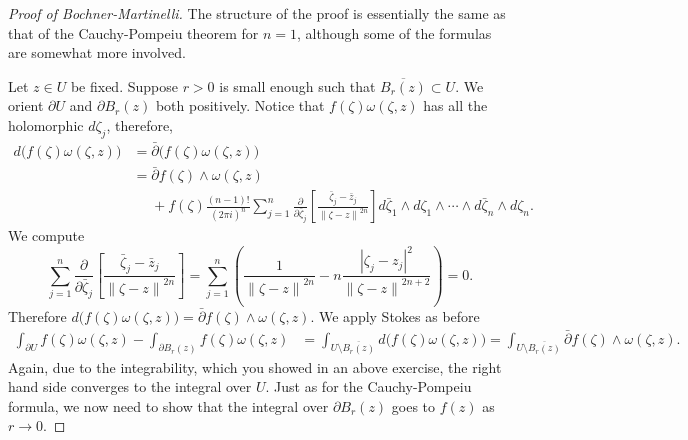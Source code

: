 \documentclass[12pt,openany]{book}
\newcommand{\abs}[1]{\left\lvert {#1} \right\rvert}
\newcommand{\norm}[1]{\left\lVert {#1} \right\rVert}
\theoremstyle{plain}
\theoremstyle{remark}
\theoremstyle{definition}
\theoremstyle{exercise}
\theoremstyle{example}
\begin{document}
\begin{proof}[Proof of Bochner-Martinelli]
The structure of the proof is essentially the same as that of
the Cauchy-Pompeiu theorem for $n=1$, although some of the formulas are somewhat
more involved.

Let $z \in U$ be fixed.  Suppose $r > 0$ is small enough such that
$\overline{B_r(z)} \subset U$.  We orient $\partial U$ and $\partial B_r(z)$
both positively.  Notice that 
$f(\zeta) \omega(\zeta,z)$ has all the holomorphic $d\zeta_j$, therefore,
\begin{equation*}
\begin{split}
d \bigl( f(\zeta) \omega(\zeta,z) \bigr)
& =
\bar{\partial} \bigl( f(\zeta) \omega(\zeta,z) \bigr)
\\
& = 
\bar{\partial} f(\zeta) \wedge \omega(\zeta,z)
\\
& \phantom{=} +
f(\zeta)
\frac{(n-1)!}{{(2\pi i)}^n}
\sum_{j=1}^n
\frac{\partial}{\partial \bar{\zeta}_j} \left[
\frac{\bar{\zeta}_j-\bar{z}_j}{\norm{\zeta-z}^{2n}}
\right]
d\bar{\zeta}_1 \wedge d\zeta_1 \wedge
\cdots \wedge
d\bar{\zeta}_n \wedge d\zeta_n .
\end{split}
\end{equation*}
We compute
\begin{equation*}
\sum_{j=1}^n
\frac{\partial}{\partial \bar{\zeta}_j}
\left[
\frac{\bar{\zeta}_j-\bar{z}_j}{\norm{\zeta-z}^{2n}}
\right]
=
\sum_{j=1}^n
\left(
\frac{1}{\norm{\zeta-z}^{2n}}
-n
\frac{\abs{\zeta_j-z_j}^2}{\norm{\zeta-z}^{2n+2}}
\right)
= 0 .
\end{equation*}
Therefore 
$d \bigl( f(\zeta) \omega(\zeta,z) \bigr) = \bar{\partial} f(\zeta) \wedge
\omega(\zeta,z)$.
We apply Stokes as before
\begin{equation*}
\begin{split}
\int_{\partial U}
f(\zeta) \omega(\zeta,z)
-
\int_{\partial B_r(z)}
f(\zeta) \omega(\zeta,z)
& =
\int_{U \setminus \overline{B_r(z)}}
d \bigl( f(\zeta) \omega(\zeta,z) \bigr)
=
\int_{U \setminus \overline{B_r(z)}}
\bar{\partial} f(\zeta) \wedge \omega(\zeta,z) .
\end{split}
\end{equation*}
Again, due to the integrability, which you showed in an above exercise,
the right hand side converges to the integral over $U$.
Just as for the Cauchy-Pompeiu formula, we now need to show that the integral
over $\partial B_r(z)$ goes to $f(z)$ as $r \to 0$.


\end{proof}
\end{document}

